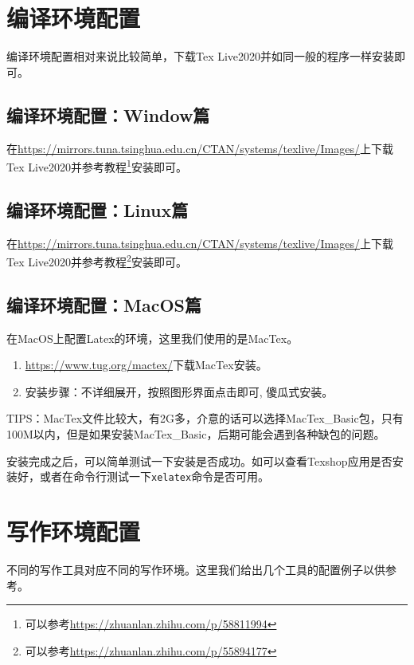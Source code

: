 \section{编译环境配置}

编译环境配置相对来说比较简单，下载Tex Live2020并如同一般的程序一样安装即可。

\subsection{编译环境配置：Window篇}

在\url{https://mirrors.tuna.tsinghua.edu.cn/CTAN/systems/texlive/Images/}上下载Tex Live2020并参考教程\footnote{可以参考\url{https://zhuanlan.zhihu.com/p/58811994}}安装即可。

\subsection{编译环境配置：Linux篇}

在\url{https://mirrors.tuna.tsinghua.edu.cn/CTAN/systems/texlive/Images/}上下载Tex Live2020并参考教程\footnote{可以参考\url{https://zhuanlan.zhihu.com/p/55894177}}安装即可。


\subsection{编译环境配置：MacOS篇}

在MacOS上配置Latex的环境，这里我们使用的是MacTex。

\begin{enumerate}
	\item \url{https://www.tug.org/mactex/}下载MacTex安装。
	\item 安装步骤：不详细展开，按照图形界面点击即可, 傻瓜式安装。
\end{enumerate}

TIPS：MacTex文件比较大，有2G多，介意的话可以选择MacTex\_Basic包，只有100M以内，但是如果安装MacTex\_Basic，后期可能会遇到各种缺包的问题。


安装完成之后，可以简单测试一下安装是否成功。如可以查看Texshop应用是否安装好，或者在命令行测试一下\texttt{xelatex}命令是否可用。

\section{写作环境配置}

不同的写作工具对应不同的写作环境。这里我们给出几个工具的配置例子以供参考。

